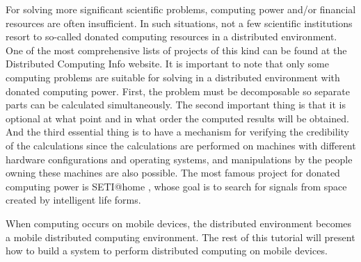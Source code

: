 For solving more significant scientific problems, computing power and/or financial resources are often insufficient. In such situations, not a few scientific institutions resort to so-called donated computing resources in a distributed environment. One of the most comprehensive lists of projects of this kind can be found at the Distributed Computing Info \cite{dcinfo} website. It is important to note that only some computing problems are suitable for solving in a distributed environment with donated computing power. First, the problem must be decomposable so separate parts can be calculated simultaneously. The second important thing is that it is optional at what point and in what order the computed results will be obtained. And the third essential thing is to have a mechanism for verifying the credibility of the calculations since the calculations are performed on machines with different hardware configurations and operating systems, and manipulations by the people owning these machines are also possible. The most famous project for donated computing power is SETI@home \cite{shuch}, whose goal is to search for signals from space created by intelligent life forms.

When computing occurs on mobile devices, the distributed environment becomes a mobile distributed computing environment. The rest of this tutorial will present how to build a system to perform distributed computing on mobile devices.
